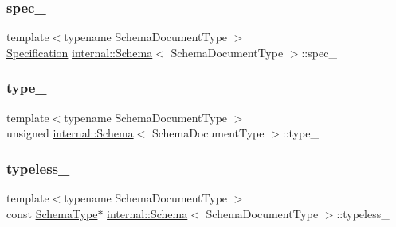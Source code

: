 \mbox{\label{classinternal_1_1Schema_a683cdd93b05a43096214caac9463387a}} 
\subsubsection{\texorpdfstring{spec\+\_\+}{spec\_}}
{\footnotesize\ttfamily template$<$typename Schema\+Document\+Type $>$ \\
\hyperlink{structSpecification}{Specification} \hyperlink{classinternal_1_1Schema}{internal\+::\+Schema}$<$ Schema\+Document\+Type $>$\+::spec\+\_\+\hspace{0.3cm}{\ttfamily [private]}}

\mbox{\label{classinternal_1_1Schema_a8cb3b7bb26a233adfea17d80ba64aeef}} 
\subsubsection{\texorpdfstring{type\+\_\+}{type\_}}
{\footnotesize\ttfamily template$<$typename Schema\+Document\+Type $>$ \\
unsigned \hyperlink{classinternal_1_1Schema}{internal\+::\+Schema}$<$ Schema\+Document\+Type $>$\+::type\+\_\+\hspace{0.3cm}{\ttfamily [private]}}

\mbox{\label{classinternal_1_1Schema_a78fab4d04b9aa76db745a22b03933211}} 
\subsubsection{\texorpdfstring{typeless\+\_\+}{typeless\_}}
{\footnotesize\ttfamily template$<$typename Schema\+Document\+Type $>$ \\
const \hyperlink{classinternal_1_1Schema_ac2556ebf7a7db971e1c1c0f76eb5786e}{Schema\+Type}$\ast$ \hyperlink{classinternal_1_1Schema}{internal\+::\+Schema}$<$ Schema\+Document\+Type $>$\+::typeless\+\_\+\hspace{0.3cm}{\ttfamily [private]}}

